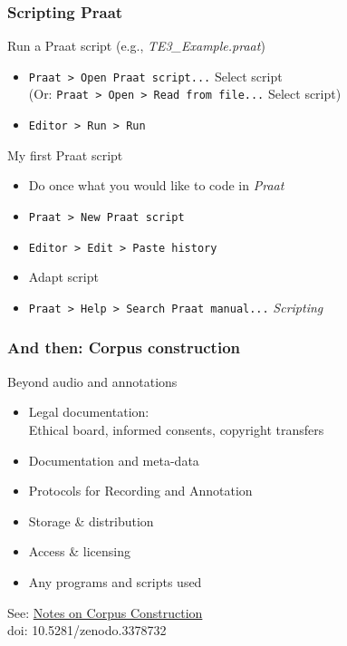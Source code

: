 \documentclass{beamer}
\begin{document}
\begin{frame} 
\frametitle{Scripting Praat} 
\begin{block}{Run a Praat script (e.g., \textit{TE3\_Example.praat})}
\begin{itemize} 
\item \texttt{Praat > Open Praat script...} Select script \\
      (Or: \texttt{Praat > Open > Read from file...} Select script)
\item \texttt{Editor > Run > Run}
\end{itemize}
\end{block} 

\begin{block}{My first Praat script}
\begin{itemize} 
\item Do once what you would like to code in \textit{Praat}
\item \texttt{Praat > New Praat script}
\item \texttt{Editor > Edit > Paste history}
\item Adapt script
\item \texttt{Praat > Help > Search Praat manual...} \textit{Scripting}
\end{itemize}
\end{block} 
\end{frame}

\begin{frame} 
\frametitle{And then: Corpus construction} 
\begin{block}{Beyond audio and annotations}
\begin{itemize} 
\item Legal documentation:\\ Ethical board, informed consents, copyright transfers
\item Documentation and meta-data
\item Protocols for Recording and Annotation
\item Storage \& distribution
\item Access \& licensing
\item Any programs and scripts used
\end{itemize}
\end{block} 
\vskip 1cm
See: \href{http://www.fon.hum.uva.nl/rob/NotesOnCorpora/NotesOnCorpusConstruction.pdf}{Notes on Corpus Construction} \\
\scriptsize{doi: 10.5281/zenodo.3378732}
\end{frame}
\end{document}
